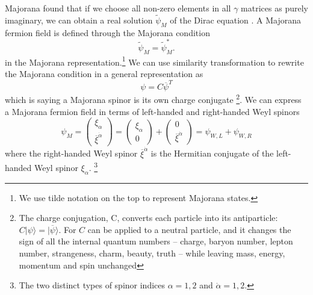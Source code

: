 \documentclass[12pt]{report}
\begin{document}
Majorana found that if we choose all non-zero elements in all $\gamma$ matrices as purely imaginary, we can obtain a real solution $\widetilde{\psi}_{M}$ of the Dirac equation \cite{majorana}.
A Majorana fermion field is defined through the Majorana condition
\begin{equation}
\widetilde{\psi}_{M} = \widetilde{\psi}^{*}_{M} .
\end{equation}
in the Majorana representation.\footnote{We use tilde notation on the top to represent Majorana states.}
We can use similarity transformation to rewrite the Majorana condition in a general representation as
\begin{equation}
\psi = C \overline{\psi}^{T}
\end{equation}
which is saying a Majorana spinor is its own charge conjugate \footnote{The charge conjugation, C, converts each particle into its antiparticle: $C| \psi \rangle = | \overline{\psi} \rangle$. For $C$ can be applied to a neutral particle, and it changes the sign of all the internal quantum numbers -- charge, baryon number, lepton number, strangeness, charm, beauty, truth -- while leaving mass, energy, momentum and spin unchanged}.
We can express a Majorana fermion field in terms of left-handed and right-handed Weyl spinors
\begin{equation}
\psi_{M} = \left( \begin{array}{c} \xi_{\alpha}\\ \overline{\xi}^{\dot{\alpha}} \end{array} \right) = \left( \begin{array}{c} \xi_{\alpha}\\0\end{array} \right) + \left( \begin{array}{c}0\\ \overline{\xi}^{\dot{\alpha}} \end{array} \right) = \psi_{W, L} + \psi_{W, R}
\end{equation}
where the right-handed Weyl spinor $\overline{\xi}^{\dot{\alpha}}$ is the Hermitian conjugate of the left-handed Weyl spinor $\xi_{\alpha}$. \footnote{The two distinct types of spinor indices $\alpha = 1, 2$ and $\dot{\alpha} = 1, 2$.}
\end{document}
